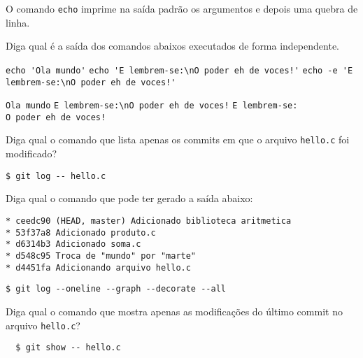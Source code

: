\begin{Exercise}[label={0027}, difficulty={0}, origin={bash}]
  O comando \lstinline+echo+ imprime na saída padrão os argumentos e depois uma
  quebra de linha.

  Diga qual é a saída dos comandos abaixos executados de forma independente.

  \Question \lstinline+echo 'Ola mundo'+
  \Question \lstinline+echo 'E lembrem-se:\nO poder eh de voces!'+
  \Question \lstinline+echo -e 'E lembrem-se:\nO poder eh de voces!'+
\end{Exercise}
\begin{Answer}[ref={0027}]
  \Question \lstinline+Ola mundo+
  \Question \lstinline+E lembrem-se:\nO poder eh de voces!+
  \Question \lstinline+E lembrem-se:+ \\
  \lstinline+O poder eh de voces!+
\end{Answer}

\begin{Exercise}[label={0029}, difficulty={1}, origin={git}]
  Diga qual o comando que lista apenas os commits em que o arquivo
  \lstinline+hello.c+ foi modificado?
\end{Exercise}
\begin{Answer}[ref={0029}]
  \begin{lstlisting}
$ git log -- hello.c
  \end{lstlisting}
\end{Answer}

\begin{Exercise}[label={0030}, difficulty={1}, origin={git}]
  Diga qual o comando que pode ter gerado a saída abaixo:
  \begin{lstlisting}
* ceedc90 (HEAD, master) Adicionado biblioteca aritmetica
* 53f37a8 Adicionado produto.c
* d6314b3 Adicionado soma.c
* d548c95 Troca de "mundo" por "marte"
* d4451fa Adicionando arquivo hello.c
  \end{lstlisting}
\end{Exercise}
\begin{Answer}[ref={0030}]
  \begin{lstlisting}
$ git log --oneline --graph --decorate --all
  \end{lstlisting}
\end{Answer}

\begin{Exercise}[label={0031}, difficulty={1}, origin={git}]
  Diga qual o comando que mostra apenas as modificações do último commit no
  arquivo \lstinline+hello.c+?
\end{Exercise}
\begin{Answer}[ref={0031}]
  \begin{lstlisting}
  $ git show -- hello.c
  \end{lstlisting}
\end{Answer}

